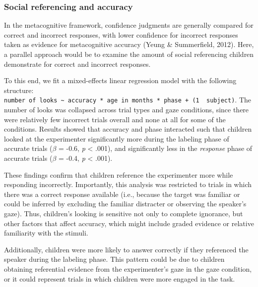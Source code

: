 \documentclass[a4paper,man,apacite,floatsintext]{apa6}
\begin{document}
\subsubsection{Social referencing and
accuracy}\label{social-referencing-and-accuracy}

In the metacognitive framework, confidence judgments are generally
compared for correct and incorrect responses, with lower confidence for
incorrect responses taken as evidence for metacognitive accuracy (Yeung
\& Summerfield, 2012). Here, a parallel approach would be to examine the
amount of social referencing children demonstrate for correct and
incorrect responses.

To this end, we fit a mixed-effects linear regression model with the
following structure:
\texttt{number\ of\ looks\ \textasciitilde{}\ accuracy\ *\ age\ in\ months\ *\ phase\ +\ (1\ \textbar{}\ subject)}.
The number of looks was collapsed across trial types and gaze
conditions, since there were relatively few incorrect trials overall and
none at all for some of the conditions. Results showed that accuracy and
phase interacted such that children looked at the experimenter
significantly more during the labeling phase of accurate trials
(\(\beta\) = -0.6, \emph{p} \textless{} .001), and significantly less in
the \emph{response} phase of accurate trials (\(\beta\) = -0.4, \emph{p}
\textless{} .001).

These findings confirm that children reference the experimenter more
while responding incorrectly. Importantly, this analysis was restricted
to trials in which there was a correct response available (i.e., because
the target was familiar or could be inferred by excluding the familiar
distracter or observing the speaker's gaze). Thus, children's looking is
sensitive not only to complete ignorance, but other factors that affect
accuracy, which might include graded evidence or relative familiarity
with the stimuli.

Additionally, children were more likely to answer correctly if they
referenced the speaker during the labeling phase. This pattern could be
due to children obtaining referential evidence from the experimenter's
gaze in the gaze condition, or it could represent trials in which
children were more engaged in the task.
\end{document}
